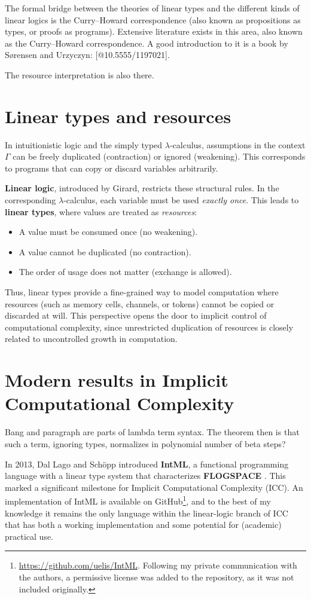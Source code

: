 The formal bridge between the theories of linear types and the different kinds of linear logics is the Curry--Howard correspondence
(also known as propositions as types, or proofs as programs).
Extensive literature exists in this area, also known as the Curry--Howard correspondence. A good introduction to it is a book by S\o{}rensen and Urzyczyn: [@10.5555/1197021].

The resource interpretation is also there.

\section{Linear types and resources}

In intuitionistic logic and the simply typed $\lambda$-calculus, assumptions in the context $\Gamma$ can be freely duplicated (contraction) or ignored (weakening). This corresponds to programs that can copy or discard variables arbitrarily.

\textbf{Linear logic}, introduced by Girard, restricts these structural rules. In the corresponding $\lambda$-calculus, each variable must be used \emph{exactly once}. This leads to \textbf{linear types}, where values are treated as \emph{resources}:
\begin{itemize}[nosep]
  \item A value must be consumed once (no weakening).
  \item A value cannot be duplicated (no contraction).
  \item The order of usage does not matter (exchange is allowed).
\end{itemize}

Thus, linear types provide a fine-grained way to model computation where resources (such as memory cells, channels, or tokens) cannot be copied or discarded at will. This perspective opens the door to implicit control of computational complexity, since unrestricted duplication of resources is closely related to uncontrolled growth in computation.

\section{Modern results in Implicit Computational Complexity}


Bang and paragraph are parts of lambda term syntax. The theorem then is that such a term,
ignoring types, normalizes in polynomial number of beta steps?


In 2013, Dal Lago and Sch\"opp introduced \textbf{IntML}, a functional programming language with a linear type system that characterizes \textbf{FLOGSPACE} \cite{DALLAGO2016150}. This marked a significant milestone for Implicit Computational Complexity (ICC). An implementation of IntML is available on GitHub\footnote{\url{https://github.com/uelis/IntML}. Following my private communication with the authors, a permissive license was added to the repository, as it was not included originally.}, and to the best of my knowledge it remains the only language within the linear-logic branch of ICC that has both a working implementation and some potential for (academic) practical use.

